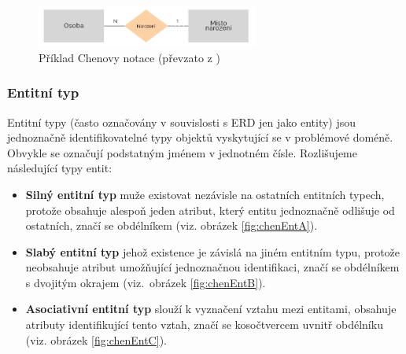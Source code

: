 \documentclass[czech,bachelor,public,dept460,male,oneside]{diploma}
\begin{document}
	\begin{figure}[!h]
		\centering
		\includegraphics[width=0.65\textwidth]{Figures/NotationExChen}
		\caption[Příklad Chenovy notace]{Příklad Chenovy notace (převzato z \cite{whatIsERD})}
		\label{fig:chenExample}
	\end{figure}
	
		\subsubsection{Entitní typ}
		Entitní typy (často označovány v souvislosti s ERD jen jako entity) jsou jednoznačně identifikovatelné typy objektů vyskytující se v problémové doméně. Obvykle se označují podstatným jménem v jednotném čísle. Rozlišujeme následující typy entit:
	
		\begin{itemize}
			\item \textbf{Silný entitní typ} muže existovat nezávisle na ostatních entitních typech, protože obsahuje alespoň jeden atribut, který entitu jednoznačně odlišuje od ostatních, značí se obdélníkem (viz. obrázek \ref{fig:chenEntA}).
			
			\item \textbf{Slabý entitní typ} jehož existence je závislá na jiném entitním typu, protože neobsahuje atribut umožňující jednoznačnou identifikaci, značí se obdélníkem s dvojitým okrajem (viz.~obrázek \ref{fig:chenEntB}).
			
			\item \textbf{Asociativní entitní typ} slouží k vyznačení vztahu mezi entitami, obsahuje atributy identifikující tento vztah, značí se kosočtvercem uvnitř obdélníku (viz. obrázek \ref{fig:chenEntC}).
		\end{itemize}
	
\end{document}
